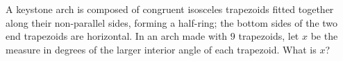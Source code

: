 A keystone arch is composed of congruent isosceles trapezoids fitted together along their non-parallel sides, forming a half-ring; the bottom sides of the two end trapezoids are horizontal. In an arch made with \(9\) trapezoids, let \(x\) be the measure in degrees of the larger interior angle of each trapezoid. What is \(x\)?
